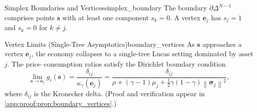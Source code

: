 \documentclass[11pt,letterpaper,oneside]{article}
\numberwithin{equation}{section}
\newcommand{\1}{\mathbf{1}}
\newcommand{\norm}[1]{\left\lVert #1\right\rVert}
\begin{document}
\begin{definition}{Simplex Boundaries and Vertices}{simplex_boundary}
The boundary $\partial\Delta^{N-1}$ comprises points $\bm{s}$ with at least one component $s_k = 0$. A vertex $\bm{e}_j$ has $s_j = 1$ and $s_k = 0$ for $k \neq j$.
\end{definition}

\begin{proposition}{Vertex Limits (Single-Tree Asymptotics)}{boundary_vertices}
As $\bm{s}$ approaches a vertex $\bm{e}_j$, the economy collapses to a single-tree Lucas setting dominated by asset $j$. The price--consumption ratios satisfy the Dirichlet boundary condition
\begin{equation}\label{eq:boundary_condition}
  \lim_{\bm{s} \to \bm{e}_j} g_i(\bm{s}) = \frac{\delta_{ij}}{\kappa_\gamma(\bm{e}_j)} = \frac{\delta_{ij}}{\rho + (\gamma-1)\mu_j + \tfrac12 \gamma(1-\gamma)\norm{\bm{\sigma}_j}^2},
\end{equation}
where $\delta_{ij}$ is the Kronecker delta. (Proof and verification appear in \cref{app:proof:prop:boundary_vertices}.)
\end{proposition}
\end{document}
